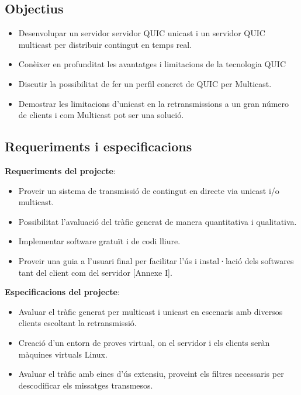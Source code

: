 \subsection{Objectius}
{
    \begin{itemize}
        \item Desenvolupar un servidor servidor QUIC unicast i un servidor QUIC multicast per distribuir contingut en temps real.
        \item Conèixer en profunditat les avantatges i limitacions de la tecnologia QUIC \cite{rfc9000}
        \item Discutir la possibilitat de fer un perfil concret de QUIC per Multicast.
        \item Demostrar les limitacions d'unicast en la retransmissions a un gran número de clients i com Multicast pot ser una solució.
    \end{itemize}
}

\subsection{Requeriments i especificacions}
{
    \textbf{Requeriments del projecte}:
    \begin{itemize}
        \item Proveir un sistema de transmissió de contingut en directe via unicast i/o multicast.
        \item Possibilitat l'avaluació del tràfic generat de manera quantitativa i qualitativa.
        \item Implementar software gratuït i de codi lliure.
        \item Proveir una guia a l'usuari final per facilitar l'ús i instal·lació dels softwares tant
                del client com del servidor [Annexe I].
    \end{itemize}
    
    \textbf{Especificacions del projecte}:
    \begin{itemize}
        \item Avaluar el tràfic generat per multicast i unicast en escenaris amb diversos clients escoltant
                la retransmissió.
        \item Creació d'un entorn de proves virtual, on el servidor i els clients seràn màquines virtuals Linux.
        \item Avaluar el tràfic amb eines d'ús extensiu, proveint els filtres necessaris per descodificar els missatges transmesos.
    \end{itemize}
}

